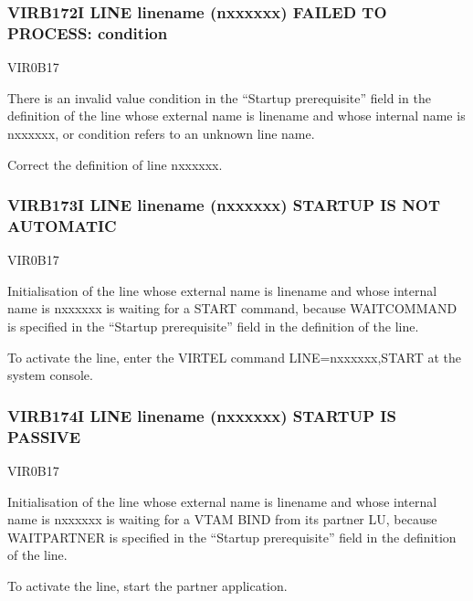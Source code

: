 \documentclass[letterpaper,10pt,english]{sphinxmanual}
\begin{document}
\subsubsection{VIRB172I LINE linename (n\sphinxhyphen{}xxxxxx) FAILED TO PROCESS: condition}
\label{\detokenize{messages:virb172i-line-linename-n-xxxxxx-failed-to-process-condition}}\begin{description}
\sphinxAtStartPar
VIR0B17

\sphinxAtStartPar
There is an invalid value condition in the “Startup prerequisite” field in the definition of the line whose external name is linename and whose internal name is n\sphinxhyphen{}xxxxxx, or condition refers to an unknown line name.

\sphinxAtStartPar
Correct the definition of line n\sphinxhyphen{}xxxxxx.

\end{description}


\subsubsection{VIRB173I LINE linename (n\sphinxhyphen{}xxxxxx) STARTUP IS NOT AUTOMATIC}
\label{\detokenize{messages:virb173i-line-linename-n-xxxxxx-startup-is-not-automatic}}\begin{description}
\sphinxAtStartPar
VIR0B17

\sphinxAtStartPar
Initialisation of the line whose external name is linename and whose internal name is n\sphinxhyphen{}xxxxxx is waiting for a START command, because WAIT\sphinxhyphen{}COMMAND is specified in the “Startup prerequisite” field in the definition of the line.

\sphinxAtStartPar
To activate the line, enter the VIRTEL command LINE=n\sphinxhyphen{}xxxxxx,START at the system console.

\end{description}


\subsubsection{VIRB174I LINE linename (n\sphinxhyphen{}xxxxxx) STARTUP IS PASSIVE}
\label{\detokenize{messages:virb174i-line-linename-n-xxxxxx-startup-is-passive}}\begin{description}
\sphinxAtStartPar
VIR0B17

\sphinxAtStartPar
Initialisation of the line whose external name is linename and whose internal name is n\sphinxhyphen{}xxxxxx is waiting for a VTAM BIND from its partner LU, because WAIT\sphinxhyphen{}PARTNER is specified in the “Startup prerequisite” field in the definition of the line.

\sphinxAtStartPar
To activate the line, start the partner application.

\end{description}
\end{document}
